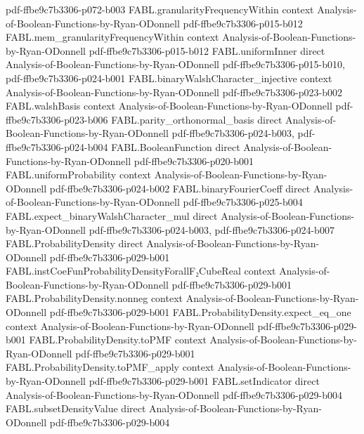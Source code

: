\begin{theorem}
  {pdf-ffbe9c7b3306-p072-b003}
\proofstep
  {FABL.granularityFrequencyWithin}
  {context}
  {Analysis-of-Boolean-Functions-by-Ryan-ODonnell}
  {pdf-ffbe9c7b3306-p015-b012}
\proofstep
  {FABL.mem_granularityFrequencyWithin}
  {context}
  {Analysis-of-Boolean-Functions-by-Ryan-ODonnell}
  {pdf-ffbe9c7b3306-p015-b012}
\proofstep
  {FABL.uniformInner}
  {direct}
  {Analysis-of-Boolean-Functions-by-Ryan-ODonnell}
  {pdf-ffbe9c7b3306-p015-b010,
    pdf-ffbe9c7b3306-p024-b001}
\proofstep
  {FABL.binaryWalshCharacter_injective}
  {context}
  {Analysis-of-Boolean-Functions-by-Ryan-ODonnell}
  {pdf-ffbe9c7b3306-p023-b002}
\proofstep
  {FABL.walshBasis}
  {context}
  {Analysis-of-Boolean-Functions-by-Ryan-ODonnell}
  {pdf-ffbe9c7b3306-p023-b006}
\proofstep
  {FABL.parity_orthonormal_basis}
  {direct}
  {Analysis-of-Boolean-Functions-by-Ryan-ODonnell}
  {pdf-ffbe9c7b3306-p024-b003,
    pdf-ffbe9c7b3306-p024-b004}
\proofstep
  {FABL.BooleanFunction}
  {direct}
  {Analysis-of-Boolean-Functions-by-Ryan-ODonnell}
  {pdf-ffbe9c7b3306-p020-b001}
\proofstep
  {FABL.uniformProbability}
  {context}
  {Analysis-of-Boolean-Functions-by-Ryan-ODonnell}
  {pdf-ffbe9c7b3306-p024-b002}
\proofstep
  {FABL.binaryFourierCoeff}
  {direct}
  {Analysis-of-Boolean-Functions-by-Ryan-ODonnell}
  {pdf-ffbe9c7b3306-p025-b004}
\proofstep
  {FABL.expect_binaryWalshCharacter_mul}
  {direct}
  {Analysis-of-Boolean-Functions-by-Ryan-ODonnell}
  {pdf-ffbe9c7b3306-p024-b003,
    pdf-ffbe9c7b3306-p024-b007}
\proofstep
  {FABL.ProbabilityDensity}
  {direct}
  {Analysis-of-Boolean-Functions-by-Ryan-ODonnell}
  {pdf-ffbe9c7b3306-p029-b001}
\proofstep
  {FABL.instCoeFunProbabilityDensityForallF₂CubeReal}
  {context}
  {Analysis-of-Boolean-Functions-by-Ryan-ODonnell}
  {pdf-ffbe9c7b3306-p029-b001}
\proofstep
  {FABL.ProbabilityDensity.nonneg}
  {context}
  {Analysis-of-Boolean-Functions-by-Ryan-ODonnell}
  {pdf-ffbe9c7b3306-p029-b001}
\proofstep
  {FABL.ProbabilityDensity.expect_eq_one}
  {context}
  {Analysis-of-Boolean-Functions-by-Ryan-ODonnell}
  {pdf-ffbe9c7b3306-p029-b001}
\proofstep
  {FABL.ProbabilityDensity.toPMF}
  {context}
  {Analysis-of-Boolean-Functions-by-Ryan-ODonnell}
  {pdf-ffbe9c7b3306-p029-b001}
\proofstep
  {FABL.ProbabilityDensity.toPMF_apply}
  {context}
  {Analysis-of-Boolean-Functions-by-Ryan-ODonnell}
  {pdf-ffbe9c7b3306-p029-b001}
\proofstep
  {FABL.setIndicator}
  {direct}
  {Analysis-of-Boolean-Functions-by-Ryan-ODonnell}
  {pdf-ffbe9c7b3306-p029-b004}
\proofstep
  {FABL.subsetDensityValue}
  {direct}
  {Analysis-of-Boolean-Functions-by-Ryan-ODonnell}
  {pdf-ffbe9c7b3306-p029-b004}

\end{theorem}
